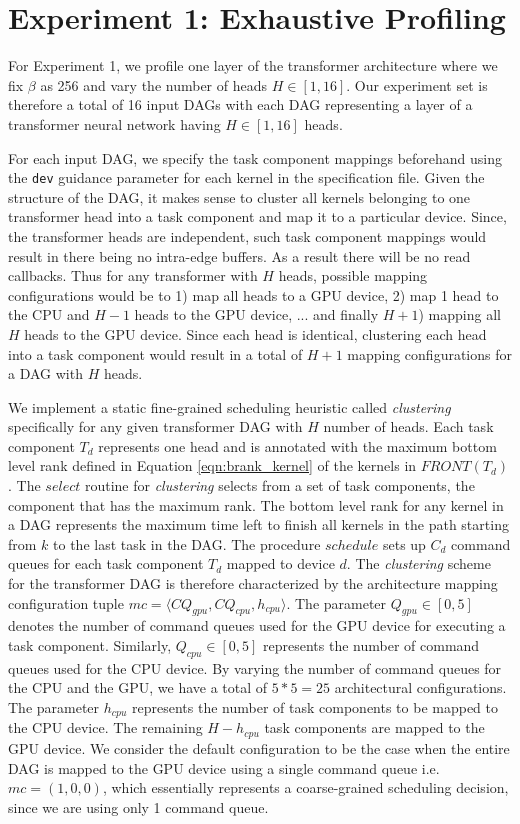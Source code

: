 	\section{Experiment 1: Exhaustive Profiling}
	For Experiment 1, we profile one layer of the transformer architecture where we fix $\beta$ as 256 and vary the number of heads $H \in [1,16]$. Our experiment set is therefore a total of 16 input DAGs with each DAG representing a layer of a transformer neural network having $H\in[1,16]$ heads. 
	\par For each input DAG, we specify the task component mappings beforehand using the {\tt dev} guidance parameter for each kernel in the specification file. Given the structure of the DAG, it makes sense to cluster all kernels belonging to one transformer head into a task component and map it to a particular device. Since, the transformer heads are independent, such task component mappings would result in  there being no intra-edge buffers. As a result there will be no read callbacks. Thus for any transformer with $H$ heads, possible mapping configurations would be to 1) map all heads to a GPU device, 2) map 1 head to the CPU and $H-1$ heads to the GPU device, ... and finally $H+1$) mapping all $H$ heads to the GPU device.  Since each head is identical, clustering each head into a task component would result in a total of $H+1$ mapping configurations for a DAG with $H$ heads.
	\par We implement a static fine-grained scheduling heuristic called {\em clustering} specifically for any given transformer DAG with $H$ number of heads. Each task component $T_d$ represents one head and is annotated with the maximum bottom level rank defined in Equation \ref{eqn:brank_kernel} of the kernels in $FRONT(T_d)$. The $select$ routine for {\em clustering }selects from a set of task components, the component that has the maximum rank. The bottom level rank for any kernel in a DAG represents the maximum time left to finish all kernels in the path starting from $k$ to the last task in the DAG. The procedure $schedule$ sets up $C_d$ command queues for each task component $T_d$ mapped to device $d$. The {\em clustering} scheme for the transformer DAG is therefore characterized by the architecture mapping configuration tuple $mc=\langle CQ_{gpu},CQ_{cpu},h_{cpu}\rangle$. The parameter $Q_{gpu}\in [0,5] $ denotes the number of command queues used for the GPU device for executing a task component. Similarly, $Q_{cpu} \in [0,5]$ represents the number of command queues used for the CPU device. By varying the number of command queues for the CPU and the GPU, we have a total of $5*5=25$  architectural configurations. The parameter $h_{cpu}$ represents  the number of task components to be mapped to the CPU device.  The remaining $H-h_{cpu}$ task components are mapped to the GPU device. We consider the default configuration to be the case when the entire DAG is mapped to the GPU device using a single command queue i.e. $mc=(1,0,0)$, which essentially represents a coarse-grained scheduling decision, since we are using only 1 command queue.
